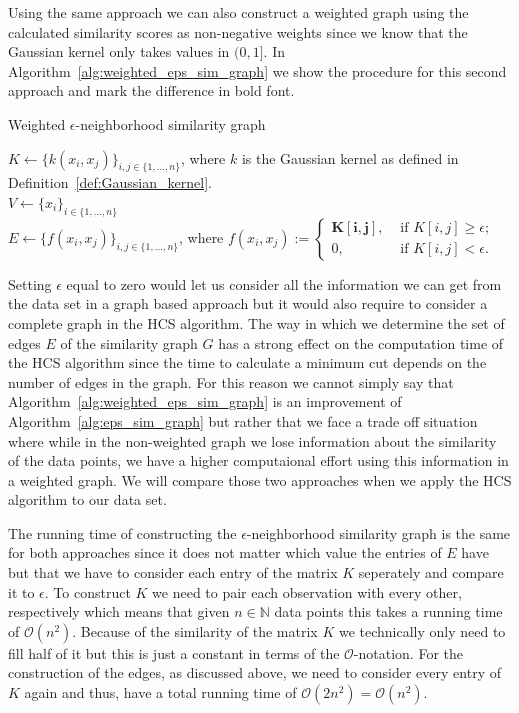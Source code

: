 \documentclass[paper=a4,fontsize=11pt,DIV=8,BCOR=5mm,twoside,pdftex,bibtotocnumbered]{scrreprt}
\newcommand{\R}{{\mathbb R}}
\newcommand{\N}{{\mathbb N}}
\theoremstyle{plain}
\begin{document}
Using the same approach we can also construct a weighted graph using the calculated similarity scores as non-negative weights since we know that the Gaussian kernel only takes values in $(0,1]$. In Algorithm~\ref{alg:weighted_eps_sim_graph} we show the procedure for this second approach and mark the difference in bold font.

\begin{algorithm}
	\caption{Weighted $\epsilon$-neighborhood similarity graph}\label{alg:weighted_eps_sim_graph}
	\KwIn{$\{x_i\}_{i \in \{1,\dots, n\}}$, $n\in\N$ data points; $\epsilon\in[0,1)$ and $\sigma^2\in\R^+$ parameters}
	$K \gets \{k(x_i, x_j)\}_{i,j \in\{1,\dots, n\}}$, where $k$ is the Gaussian kernel as defined in Definition~\ref{def:Gaussian_kernel}.\\
	$V \gets \{x_i\}_{i \in \{1,\dots, n\}}$\\
	$E \gets \{f(x_i, x_j)\}_{i,j \in\{1,\dots, n\}}$, where $f(x_i, x_j):=
		\begin{cases}
			\boldsymbol{K[i,j]}, & \text{ if } K[i,j] \ge \epsilon;\\
			0, & \text{ if } K[i,j] < \epsilon.
		\end{cases}$
\end{algorithm}

Setting $\epsilon$ equal to zero would let us consider all the information we can get from the data set in a graph based approach but it would also require to consider a complete graph in the HCS algorithm. The way in which we determine the set of edges $E$ of the similarity graph $G$ has a strong effect on the computation time of the HCS algorithm since the time to calculate a minimum cut depends on the number of edges in the graph. For this reason we cannot simply say that Algorithm~\ref{alg:weighted_eps_sim_graph} is an improvement of Algorithm~\ref{alg:eps_sim_graph} but rather that we face a trade off situation where while in the non-weighted graph we lose information about the similarity of the data points, we have a higher computaional effort using this information in a weighted graph. We will compare those two approaches when we apply the HCS algorithm to our data set.

The running time of constructing the $\epsilon$-neighborhood similarity graph is the same for both approaches since it does not matter which value the entries of $E$ have but that we have to consider each entry of the matrix $K$ seperately and compare it to $\epsilon$. To construct $K$ we need to pair each observation with every other, respectively which means that given $n\in\N$ data points this takes a running time of $\mathcal{O}(n^2)$. Because of the similarity of the matrix $K$ we technically only need to fill half of it but this is just a constant in terms of the $\mathcal{O}$-notation. For the construction of the edges, as discussed above, we need to consider every entry of $K$ again and thus, have a total running time of $\mathcal{O}(2n^2) = \mathcal{O}(n^2)$.
\end{document}
